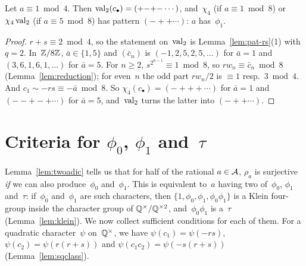 \begin{lemma}
  \label{lem:pat-dyadic}
  \leanok
  Let $a \equiv 1 \bmod 4$. Then $\operatorname{val}_2(c_\bullet) = ({+}{-}{+}{-}\cdots)$, and~$\chi_4$ (if
  $a \equiv 1 \bmod 8$) or~$\chi_4 \operatorname{val}_2$ (if $a \equiv 5 \bmod 8$) has pattern
  $({-}{+}{+}\cdots)$: $a$ has~$\phi_1$.
\end{lemma}
\begin{proof}
  \leanok
  $r + s \equiv 2 \bmod 4$, so the statement on~$\operatorname{val}_2$ is Lemma~\ref{lem:pat-rs}(1) with $q = 2$.
  In~$\mathbb{Z}/8\mathbb{Z}$, $\bar a \in \{1, 5\}$ and $(\bar c_n)$ is $(-1, 2, 5, 2, 5, \dots)$ for
  $\bar a = 1$ and $(3, 6, 1, 6, 1, \dots)$ for $\bar a = 5$. For $n \ge 2$,
  $s^{2^{n-1}} \equiv 1 \bmod 8$, so $r w_n \equiv \bar c_n \bmod 8$ (Lemma~\ref{lem:reduction});
  for even~$n$ the odd part $r w_n / 2$ is $\equiv 1$ resp.\ $3 \bmod 4$. And
  $c_1 \sim -rs \equiv -\bar a \bmod 8$. So $\chi_4(c_\bullet) = ({-}{+}{+}{+}\cdots)$ for
  $\bar a = 1$ and $({-}{-}{+}{-}{+}\cdots)$ for $\bar a = 5$, and~$\operatorname{val}_2$ turns the latter into
  $({-}{+}{+}\cdots)$.
\end{proof}

\section{Criteria for \texorpdfstring{$\phi_0$, $\phi_1$ and~$\tau$}{phi\_0, phi\_1 and tau}}
\paperitems

Lemma~\ref{lem:twoadic} tells us that for half of the rational $a \in \mathcal{A}$, $\rho_a$ is
surjective \emph{if} we can also produce~$\phi_0$ and~$\phi_1$. This is equivalent to~$a$ having
two of~$\phi_0$, $\phi_1$ and~$\tau$: if~$\phi_0$ and~$\phi_1$ are such characters, then
$\{1, \phi_0, \phi_1, \phi_0\phi_1\}$ is a Klein four-group inside the character group of
$\mathbb{Q}^\times/\mathbb{Q}^{\times 2}$, and~$\phi_0\phi_1$ is a~$\tau$ (Lemma~\ref{lem:klein}). We now collect
sufficient conditions for each of them. For a quadratic character~$\psi$ on~$\mathbb{Q}^\times$, we have
$\psi(c_1) = \psi(-rs)$, $\psi(c_2) = \psi(r(r + s))$ and $\psi(c_1 c_2) = \psi(-s(r + s))$
(Lemma~\ref{lem:sqclass}).

